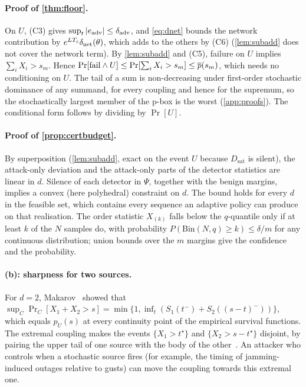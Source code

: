 \paragraph{Proof of \cref{thm:floor}.}
On $U$, (C3) gives $\sup_t|e_{\mathrm{adv}}|\le\delta_{\mathrm{adv}}$, and \eqref{eq:dnet} bounds
the network contribution by $e^{LT_c}\delta_{\mathrm{net}}(\theta)$, which adds to the others
by (C6) (\cref{lem:subadd} does not cover the network term). By \cref{lem:subadd} and
(C5), failure on $U$ implies $\sum_iX_i>s_m$. Hence
$\Pr[\text{fail}\wedge U]\le\Pr[\sum_iX_i>s_m]\le\overline{p}(s_m)$, which needs no
conditioning on $U$. The tail of a sum is non-decreasing under first-order
stochastic dominance of any summand, for every coupling and hence for the
supremum, so the stochastically largest member of the p-box is the worst
(\cref{app:proofs}). The conditional form follows by dividing by $\Pr[U]$.

\paragraph{Proof of \cref{prop:certbudget}.}
By superposition (\cref{lem:subadd}, exact on the event $U$ because
$D_{\mathrm{sat}}$ is silent), the attack-only deviation and the attack-only parts
of the detector statistics are linear in $d$. Silence of each detector in $\Psi$, together with
the benign margins, implies a convex (here polyhedral) constraint on $d$. The
bound holds for every $d$ in the feasible set, which contains every sequence an
adaptive policy can produce on that realisation. The order statistic
$X_{(k)}$ falls below the $q$-quantile only if at least $k$ of the $N$ samples do,
with probability $P(\mathrm{Bin}(N,q)\ge k)\le\delta/m$ for any continuous
distribution; union bounds over the $m$ margins give the confidence and the
probability.

\paragraph{(b): sharpness for two sources.}
For $d=2$, Makarov~\cite{makarov1981} showed that
$\sup_C\Pr_C[X_1+X_2>s]=\min\{1,\inf_{t}(S_1(t^-)+S_2((s-t)^-))\}$,
which equals $p_U(s)$ at every continuity point of the empirical survival
functions. The extremal coupling makes the events $\{X_1>t^\star\}$ and
$\{X_2>s-t^\star\}$ disjoint, by pairing the upper tail of one source with the
body of the other~\cite{frank1987}. An attacker who controls when a stochastic
source fires (for example, the timing of jamming-induced outages relative to
gusts) can move the coupling towards this extremal one.

